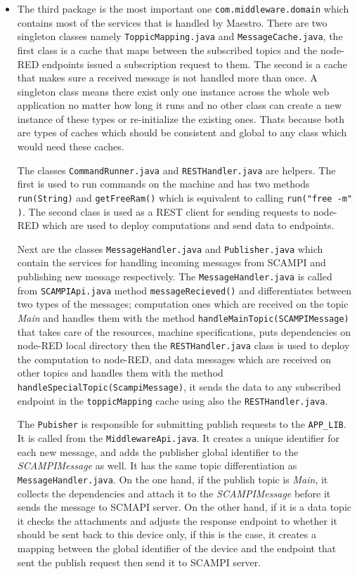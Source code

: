 \begin{itemize}
 
 \item The third package is the most important one \verb|com.middleware.domain| which contains most of the services that is handled by Maestro. There are two singleton classes namely \verb|ToppicMapping.java| and \verb|MessageCache.java|, the first class is a cache that maps between the subscribed topics and the node-RED endpoints issued a subscription request to them. The second is a cache that makes sure a received message is not handled more than once. A singleton class means there exist only one instance across the whole web application no matter how long it runs and no other class can create a new instance of these types or re-initialize the existing ones. Thats because both are types of caches which should be consistent and global to any class which would need these caches. 
 
 The classes \verb|CommandRunner.java| and \verb|RESTHandler.java| are helpers. The first is used to run commands on the machine and  has two methods \verb|run(String)| and \verb|getFreeRam()| which is equivalent to calling \verb|run("free -m" )|. The second class is used as a REST client for sending requests to node-RED which are used to deploy computations and  send data to endpoints.
 
  Next are the classes \verb|MessageHandler.java| and \verb|Publisher.java| which contain the services for handling incoming messages from SCAMPI and publishing new message respectively. The \verb|MessageHandler.java| is called from  \verb|SCAMPIApi.java| method \verb|messageRecieved()| and differentiates between two types of the messages; computation ones which are received on the topic \textit{Main} and handles them with the method \verb|handleMainTopic(SCAMPIMessage)| that takes care of the resources, machine specifications, puts dependencies on node-RED local directory then the \verb|RESTHandler.java| class is used to deploy the computation to node-RED, and data messages which are received on other topics and handles them with the method \verb|handleSpecialTopic(ScampiMessage)|, it sends the data to any subscribed endpoint in the \verb|toppicMapping| cache using also the \verb|RESTHandler.java|.
 
 The \verb|Pubisher| is responsible for submitting publish requests to the \verb|APP_LIB|. It is called from the \verb|MiddlewareApi.java|.  It creates a unique identifier for each new message, and adds the publisher global identifier to the \textit{SCAMPIMessage} as well. It has the same topic differentiation as \verb|MessageHandler.java|.
 On the one hand, if the publish topic is \textit{Main}, it collects the dependencies and attach it to the \textit{SCAMPIMessage} before it sends the message to SCMAPI server. On the other hand, if it is a data topic it checks the attachments and adjusts the response endpoint  to whether it should be sent back to this device only, if this is the case, it creates a mapping between the global identifier of the device and the endpoint that sent the publish request then send it to SCAMPI server. \\
 

\end{itemize}

